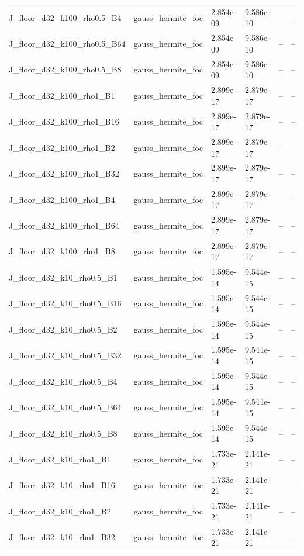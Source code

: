 \begin{tabular}{llllll}
J\_floor\_d32\_k100\_rho0.5\_B4 & gauss\_hermite\_foc & 2.854e-09 & 9.586e-10 & -- & -- \\
J\_floor\_d32\_k100\_rho0.5\_B64 & gauss\_hermite\_foc & 2.854e-09 & 9.586e-10 & -- & -- \\
J\_floor\_d32\_k100\_rho0.5\_B8 & gauss\_hermite\_foc & 2.854e-09 & 9.586e-10 & -- & -- \\
J\_floor\_d32\_k100\_rho1\_B1 & gauss\_hermite\_foc & 2.899e-17 & 2.879e-17 & -- & -- \\
J\_floor\_d32\_k100\_rho1\_B16 & gauss\_hermite\_foc & 2.899e-17 & 2.879e-17 & -- & -- \\
J\_floor\_d32\_k100\_rho1\_B2 & gauss\_hermite\_foc & 2.899e-17 & 2.879e-17 & -- & -- \\
J\_floor\_d32\_k100\_rho1\_B32 & gauss\_hermite\_foc & 2.899e-17 & 2.879e-17 & -- & -- \\
J\_floor\_d32\_k100\_rho1\_B4 & gauss\_hermite\_foc & 2.899e-17 & 2.879e-17 & -- & -- \\
J\_floor\_d32\_k100\_rho1\_B64 & gauss\_hermite\_foc & 2.899e-17 & 2.879e-17 & -- & -- \\
J\_floor\_d32\_k100\_rho1\_B8 & gauss\_hermite\_foc & 2.899e-17 & 2.879e-17 & -- & -- \\
J\_floor\_d32\_k10\_rho0.5\_B1 & gauss\_hermite\_foc & 1.595e-14 & 9.544e-15 & -- & -- \\
J\_floor\_d32\_k10\_rho0.5\_B16 & gauss\_hermite\_foc & 1.595e-14 & 9.544e-15 & -- & -- \\
J\_floor\_d32\_k10\_rho0.5\_B2 & gauss\_hermite\_foc & 1.595e-14 & 9.544e-15 & -- & -- \\
J\_floor\_d32\_k10\_rho0.5\_B32 & gauss\_hermite\_foc & 1.595e-14 & 9.544e-15 & -- & -- \\
J\_floor\_d32\_k10\_rho0.5\_B4 & gauss\_hermite\_foc & 1.595e-14 & 9.544e-15 & -- & -- \\
J\_floor\_d32\_k10\_rho0.5\_B64 & gauss\_hermite\_foc & 1.595e-14 & 9.544e-15 & -- & -- \\
J\_floor\_d32\_k10\_rho0.5\_B8 & gauss\_hermite\_foc & 1.595e-14 & 9.544e-15 & -- & -- \\
J\_floor\_d32\_k10\_rho1\_B1 & gauss\_hermite\_foc & 1.733e-21 & 2.141e-21 & -- & -- \\
J\_floor\_d32\_k10\_rho1\_B16 & gauss\_hermite\_foc & 1.733e-21 & 2.141e-21 & -- & -- \\
J\_floor\_d32\_k10\_rho1\_B2 & gauss\_hermite\_foc & 1.733e-21 & 2.141e-21 & -- & -- \\
J\_floor\_d32\_k10\_rho1\_B32 & gauss\_hermite\_foc & 1.733e-21 & 2.141e-21 & -- & -- \\

\end{tabular}
